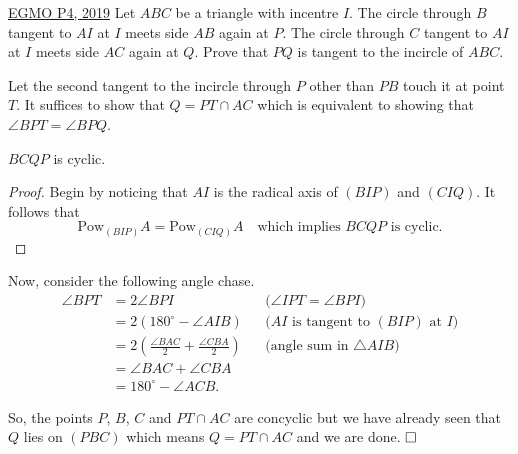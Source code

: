 \begin{problem}{6}{\href{https://artofproblemsolving.com/community/q2h1819300p35507923}{EGMO P4, 2019}} 
	Let $ABC$ be a triangle with incentre $I$. The circle through $B$ tangent to $AI$ at $I$ meets side $AB$ again at $P$. The circle through $C$ tangent to $AI$ at $I$ meets side $AC$ again at $Q$. Prove that $PQ$ is tangent to the incircle of $ABC$.
	\begin{solution} Let the second tangent to the incircle through $P$ other than $PB$ touch it at point $T$. It suffices to show that $Q=PT\cap AC$ which is equivalent to showing that $\angle BPT=\angle BPQ$.
	
	\begin{numclaim}{1} $BCQP$ is cyclic.
	\end{numclaim}
	
	\begin{proof} Begin by noticing that $AI$ is the radical axis of $(BIP)$ and $(CIQ)$. It follows that
$$\text{Pow}_{(BIP)}A=\text{Pow}_{(CIQ)}A\quad\text{which implies $BCQP$ is cyclic.}$$
	\end{proof}
	
	\noindent Now, consider the following angle chase.
	\begin{align*} \angle BPT &=2\angle BPI && \text{($\angle IPT=\angle BPI$)} \\ &=2(180^{\circ}-\angle AIB) && \text{($AI$ is tangent to $(BIP)$ at $I$)}\\ &=2\left(\frac{\angle BAC}{2}+\frac{\angle CBA}{2}\right) && \text{(angle sum in $\triangle AIB$)}\\ &=\angle BAC+\angle CBA\\ &=180^{\circ}-\angle ACB.
	\end{align*}
	\par So, the points $P$, $B$, $C$ and $PT\cap AC$ are concyclic but we have already seen that $Q$ lies on $(PBC)$ which means $Q=PT\cap AC$ and we are done. $\qedwhite$
	\end{solution}
\end{problem}

